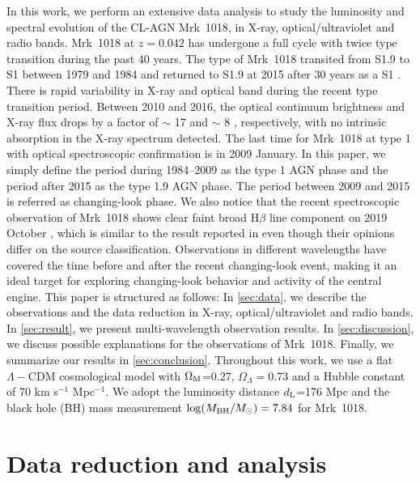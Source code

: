 \documentclass[twocolumn]{aastex63}
\begin{document}
In this work, we perform an extensive data analysis to study the luminosity and spectral evolution of the CL-AGN Mrk~1018, in X-ray, optical/ultraviolet and radio bands. Mrk~1018 at $z=0.042$ has undergone a full cycle with twice type transition during the past 40 years. The type of Mrk~1018 transited from S1.9 to S1 between 1979 and 1984 \citep{1986ApJ...311..135C} and returned to S1.9 at 2015 after 30 years as a S1 \citep[see also][]{2016A&A...593L...8M,2016A&A...593L...9H,2017A&A...607L...9K}. There is rapid variability in X-ray and optical band during the recent type transition period. Between 2010 and 2016, the optical continuum brightness and X-ray flux drops by a factor of $\sim$ 17 and $\sim$ 8 \citep{2016A&A...593L...9H}, respectively, with no intrinsic absorption in the X-ray spectrum detected. The last time for Mrk~1018 at type 1 with optical spectroscopic confirmation is in 2009 January. In this paper, we simply define the period during 1984--2009 as the type 1 AGN phase and the period after 2015 as the type 1.9 AGN phase. The period between 2009 and 2015 is referred as changing-look phase. We also notice that the recent spectroscopic observation of Mrk~1018 shows clear faint broad H$\beta$ line component on 2019 October \citep{2020A&A...644L...5H}, which is similar to the result reported in \citet{2016A&A...593L...8M} even though their opinions differ on the source classification. Observations in different wavelengths have covered the time before and after the recent changing-look event, making it an ideal target for exploring changing-look behavior and activity of the central engine. This paper is structured as follows: In \autoref{sec:data}, we describe the observations and the data reduction in X-ray, optical/ultraviolet and radio bands. In \autoref{sec:result}, we present multi-wavelength observation results. In \autoref{sec:discussion}, we discuss possible explanations for the observations of Mrk~1018. Finally, we summarize our results in \autoref{sec:conclusion}. Throughout this work, we use a flat $\Lambda-$CDM cosmological model with $\Omega_{\rm{M}}$=0.27, $\Omega_\Lambda=$0.73 and a Hubble constant of 70 km s$^{-1}$ Mpc$^{-1}$. We adopt the luminosity distance $d_{\rm{L}}$=176 Mpc and the black hole (BH) mass measurement $\log(M_{\rm{BH}}/M_{\odot})=7.84$ \citep{2017MNRAS.472.3492E,2018MNRAS.480.3898N} for Mrk~1018. 


\section{Data reduction and analysis}\label{sec:data}
\end{document}

